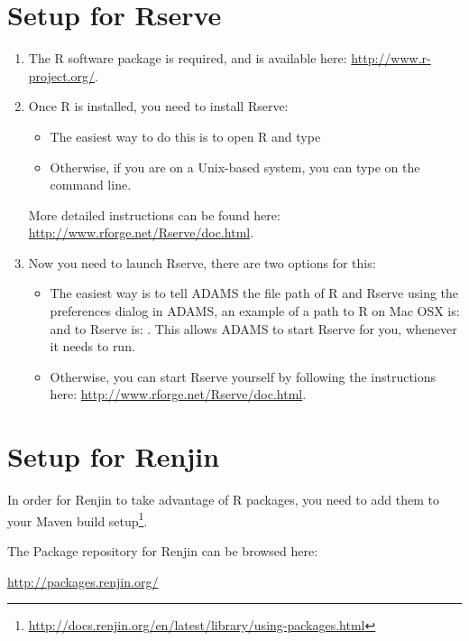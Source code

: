 \documentclass[a4paper]{book}
\begin{document}
\chapter{Setup for Rserve}
\sloppy
\begin{enumerate}
	\item The R software package is required, and is available
		here: \url{http://www.r-project.org/}.
	\item Once R is installed, you need to install Rserve:
		\begin{itemize}
		  \item The easiest way to do this is to open R and type
		  \item Otherwise, if you are on a Unix-based system, you can type 
		   on the
		  command line.
		\end{itemize}
		More detailed instructions can be found here:
		\url{http://www.rforge.net/Rserve/doc.html}.
	\item Now you need to launch Rserve, there are two options for this:
		\begin{itemize}
		  \item The easiest way is to tell ADAMS the file path of R and Rserve using
		  the preferences dialog in ADAMS, an example of a path to R on Mac OSX is:
		   and to Rserve is:
		  .
		  This allows ADAMS to start Rserve for you, whenever it needs to run.
		  \item Otherwise, you can start Rserve yourself by following the instructions
		  here: \url{http://www.rforge.net/Rserve/doc.html}.
		\end{itemize}
\end{enumerate}
\fussy

\chapter{Setup for Renjin}
In order for Renjin to take advantage of R packages, you need to add them to your
Maven build setup\footnote{\url{http://docs.renjin.org/en/latest/library/using-packages.html}{}}.

The Package repository for Renjin can be browsed here:

\url{http://packages.renjin.org/}{}


\end{document}
